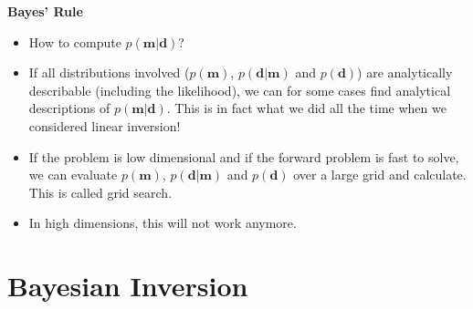 \documentclass[aspectratio=169]{beamer}
\begin{document}
\begin{frame}{\textbf{Bayes' Rule}}

\begin{itemize}
  \item[$\bullet$] How to compute \( p(\mathbf{m}|\mathbf{d}) \)?
  \item[$\bullet$] If all distributions involved (\( p(\mathbf{m}) \), \( p(\mathbf{d}|\mathbf{m}) \) and \( p(\mathbf{d}) \)) are analytically describable (including the likelihood), we can for some cases find analytical descriptions of \( p(\mathbf{m}|\mathbf{d}) \). This is in fact what we did all the time when we considered linear inversion!
  \item[$\bullet$] If the problem is low dimensional and if the forward problem is fast to solve, we can evaluate \( p(\mathbf{m}) \), \( p(\mathbf{d}|\mathbf{m}) \) and \( p(\mathbf{d}) \) over a large grid and calculate. This is called grid search.
  \item[$\bullet$] In high dimensions, this will not work anymore.
\end{itemize}

\end{frame}

\section{Bayesian Inversion}
\subsection{}
\end{document}
